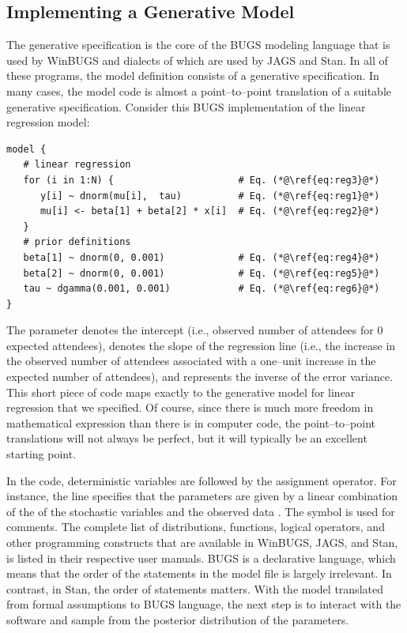 \subsection{Implementing a Generative Model}
The generative specification is the core of the BUGS modeling language \cite{LunnEtAl2000} that is used by WinBUGS and dialects of which are used by JAGS and Stan. In all of these programs, the model definition consists of a generative specification. In many cases, the model code is almost a point--to--point translation of a suitable generative specification. Consider this BUGS implementation of the linear regression model:

\begin{lstlisting}
model {
   # linear regression
   for (i in 1:N) {                      # Eq. (*@\ref{eq:reg3}@*)
      y[i] ~ dnorm(mu[i],  tau)          # Eq. (*@\ref{eq:reg1}@*)
      mu[i] <- beta[1] + beta[2] * x[i]  # Eq. (*@\ref{eq:reg2}@*)
   }
   # prior definitions
   beta[1] ~ dnorm(0, 0.001)             # Eq. (*@\ref{eq:reg4}@*)
   beta[2] ~ dnorm(0, 0.001)             # Eq. (*@\ref{eq:reg5}@*)
   tau ~ dgamma(0.001, 0.001)            # Eq. (*@\ref{eq:reg6}@*)
}
\end{lstlisting}

{The parameter  denotes the intercept (i.e., observed number of attendees for $0$ expected attendees),  denotes the slope of the regression line (i.e., the increase in the observed number of attendees associated with a one--unit increase in the expected number of attendees), and  represents the inverse of the error variance.} This short piece of code maps exactly to the generative model for linear regression that we specified. Of course, since there is much more freedom in mathematical expression than there is in computer code, the point--to--point translations will not always be perfect, but it will typically be an excellent starting point. 

In the code, deterministic variables are followed by the \code{<-} assignment operator. For instance, the line  specifies that the  parameters are given by a linear combination of the of the stochastic  variables and the observed data . The \code{\#} symbol is used for comments. The complete list of distributions, functions, logical operators, and other programming constructs that are available in WinBUGS, JAGS, and Stan, is listed in their respective user manuals. BUGS is a declarative language, which means that the order of the statements in the model file is largely irrelevant. In contrast, in Stan, the order of statements  matters. With the model translated from formal assumptions to BUGS language, the next step is to interact with the software and sample from the posterior distribution of the parameters.


